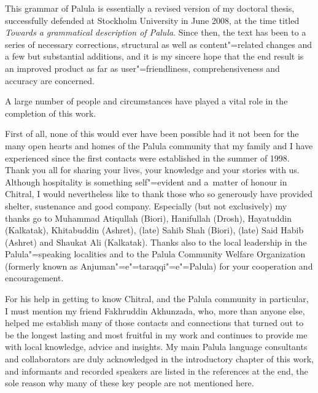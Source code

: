 \begin{refsection}

This grammar of Palula is essentially a revised version of my doctoral thesis, successfully defended at Stockholm University in June 2008, at the time titled \textit{Towards a grammatical description of Palula}. Since then, the text has been  to a series of necessary corrections, structural as well as content"=related changes and a few but substantial additions, and it is my sincere hope that the end result is an improved product as far as user"=friendliness, comprehensiveness and accuracy are concerned.


A large number of people and circumstances have played a vital role in the completion of this work.


First of all, none of this would ever have been possible had it not been for the many open hearts and homes of the Palula community that my family and I have experienced since the first contacts were established in the summer of 1998. Thank you all for sharing your lives, your knowledge and your stories with us. Although hospitality is something self"=evident and a~matter of honour in Chitral, I would nevertheless like to thank those who so generously have provided shelter, sustenance and good company. Especially (but not exclusively) my thanks go to Muhammad Atiqullah (Biori), Hanifullah (Drosh), Hayatuddin (Kalkatak), Khitabuddin (Ashret), (late) Sahib Shah (Biori), (late) Said Habib (Ashret) and Shaukat Ali (Kalkatak). Thanks also to the local leadership in the Palula"=speaking localities and to the Palula Community Welfare Organization (formerly known as Anjuman"=e"=taraqqi"=e"=Palula) for your cooperation and encouragement. 


For his help in getting to know Chitral, and the Palula community in particular, I must mention my friend Fakhruddin Akhunzada, who, more than anyone else, helped me establish many of those contacts and connections that turned out to be the longest lasting and most fruitful in my work and continues to provide me with local knowledge, advice and insights. My main Palula language consultants and collaborators are duly acknowledged in the introductory chapter of this work, and informants and recorded speakers are listed in the references at the end, the sole reason why many of these key people are not mentioned here.



\end{refsection}
